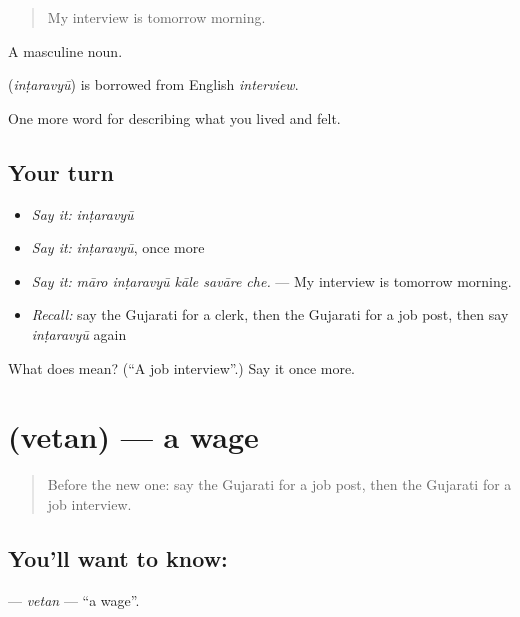 \begin{quote}
My interview is tomorrow morning.
\end{quote}

A masculine noun.

\begin{cousinweb}
\textbf{} (\emph{inṭaravyū}) is borrowed from English \emph{interview}.
\end{cousinweb}

\begin{grammarlens}[title={What you've built}]
One more word for describing what you lived and felt.
\end{grammarlens}

\subsection*{Your turn}
\begin{itemize}
\raggedright
  \item \emph{Say it:} \emph{inṭaravyū}
  \item \emph{Say it:} \emph{inṭaravyū}, once more
  \item \emph{Say it:} \emph{māro inṭaravyū kāle savāre che.} — My interview is tomorrow morning.
  \item \emph{Recall:} say the Gujarati for a clerk, then the Gujarati for a job post, then say \emph{inṭaravyū} again
\end{itemize}

\begin{tcolorbox}[breakable,colback=teal!4,colframe=teal!35!black,title={Before you move on}]
What does  mean? (\textquotedblleft{}A job interview\textquotedblright{}.) Say it once more.
\end{tcolorbox}
\section[\texorpdfstring{\gu{વેતન} (vetan)}{વેતન (vetan)}]{ (vetan) — a wage}

\label{lesson:GU-C512-vetan}



\begin{quote}
Before the new one: say the Gujarati for a job post, then the Gujarati for a job interview.
\end{quote}

\subsection*{You'll want to know: }
\textbf{} — \emph{vetan} — \textquotedblleft{}a wage\textquotedblright{}.

